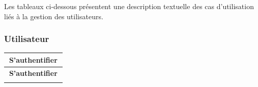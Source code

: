 
Les tableaux ci-dessous présentent une description textuelle des cas d'utilisation liés à la gestion des utilisateurs.

\subsubsection{Utilisateur}

\begin{longtable}[c]{|p{0.3\linewidth}|p{0.65\linewidth}|}
  \hline
  \multicolumn{2}{|c|}{\textbf{S'authentifier}}                                                                                                  \\
  \hline
  \endfirsthead

  \hline
  \multicolumn{2}{|c|}{\textbf{S'authentifier}}                                                                                                  \\
  \hline
  \endhead

  \hline
  \endfoot

  \hline
  \endlastfoot


\end{longtable}
